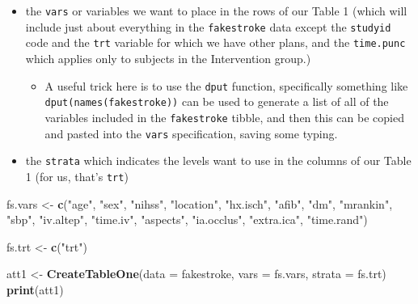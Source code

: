 \documentclass[]{book}
\newenvironment{Shaded}{\begin{snugshade}}{\end{snugshade}}
\newcommand{\KeywordTok}[1]{\textcolor[rgb]{0.13,0.29,0.53}{\textbf{#1}}}
\newcommand{\DataTypeTok}[1]{\textcolor[rgb]{0.13,0.29,0.53}{#1}}
\newcommand{\StringTok}[1]{\textcolor[rgb]{0.31,0.60,0.02}{#1}}
\newcommand{\NormalTok}[1]{#1}
\providecommand{\tightlist}{%
  \setlength{\itemsep}{0pt}\setlength{\parskip}{0pt}}
\theoremstyle{definition}
\theoremstyle{definition}
\theoremstyle{definition}
\theoremstyle{remark}
\begin{document}
\begin{itemize}
\tightlist
\item
  the \texttt{vars} or variables we want to place in the rows of our
  Table 1 (which will include just about everything in the
  \texttt{fakestroke} data except the \texttt{studyid} code and the
  \texttt{trt} variable for which we have other plans, and the
  \texttt{time.punc} which applies only to subjects in the Intervention
  group.)

  \begin{itemize}
  \tightlist
  \item
    A useful trick here is to use the \texttt{dput} function,
    specifically something like \texttt{dput(names(fakestroke))} can be
    used to generate a list of all of the variables included in the
    \texttt{fakestroke} tibble, and then this can be copied and pasted
    into the \texttt{vars} specification, saving some typing.
  \end{itemize}
\item
  the \texttt{strata} which indicates the levels want to use in the
  columns of our Table 1 (for us, that's \texttt{trt})
\end{itemize}

\begin{Shaded}
\begin{Highlighting}[]
\NormalTok{fs.vars <-}\StringTok{ }\KeywordTok{c}\NormalTok{(}\StringTok{"age"}\NormalTok{, }\StringTok{"sex"}\NormalTok{, }\StringTok{"nihss"}\NormalTok{, }\StringTok{"location"}\NormalTok{, }
          \StringTok{"hx.isch"}\NormalTok{, }\StringTok{"afib"}\NormalTok{, }\StringTok{"dm"}\NormalTok{, }\StringTok{"mrankin"}\NormalTok{, }\StringTok{"sbp"}\NormalTok{,}
          \StringTok{"iv.altep"}\NormalTok{, }\StringTok{"time.iv"}\NormalTok{, }\StringTok{"aspects"}\NormalTok{, }
          \StringTok{"ia.occlus"}\NormalTok{, }\StringTok{"extra.ica"}\NormalTok{, }\StringTok{"time.rand"}\NormalTok{)}

\NormalTok{fs.trt <-}\StringTok{ }\KeywordTok{c}\NormalTok{(}\StringTok{"trt"}\NormalTok{)}

\NormalTok{att1 <-}\StringTok{ }\KeywordTok{CreateTableOne}\NormalTok{(}\DataTypeTok{data =}\NormalTok{ fakestroke, }
                       \DataTypeTok{vars =}\NormalTok{ fs.vars, }
                       \DataTypeTok{strata =}\NormalTok{ fs.trt)}
\KeywordTok{print}\NormalTok{(att1)}
\end{Highlighting}
\end{Shaded}
\end{document}
